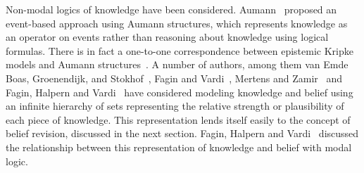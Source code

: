 Non-modal logics of knowledge have been considered. 
Aumann~\cite{aumann:1976} proposed an event-based approach using Aumann structures, which represents knowledge as an operator on events rather than reasoning about knowledge using logical formulas.
There is in fact a one-to-one correspondence between epistemic Kripke models and Aumann structures~\cite{fagin:1995}.
A number of authors, among them van Emde Boas, Groenendijk, and Stokhof~\cite{vanemdeboas:1980}, Fagin and Vardi~\cite{fagin:1985}, Mertens and Zamir~\cite{mertens:1985} and Fagin, Halpern and Vardi~\cite{fagin:1991} have considered modeling knowledge and belief using an infinite hierarchy of sets representing the relative strength or plausibility of each piece of knowledge.
This representation lends itself easily to the concept of belief revision, discussed in the next section.
Fagin, Halpern and Vardi~\cite{fagin:1991} discussed the relationship between this representation of knowledge and belief with modal logic.  




